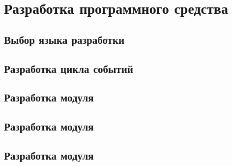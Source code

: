 \section{Разработка программного средства}

\subsection{Выбор языка разработки}


\subsection{Разработка цикла событий}


\subsection{Разработка модуля }

\subsection{Разработка модуля }

\subsection{Разработка модуля }

